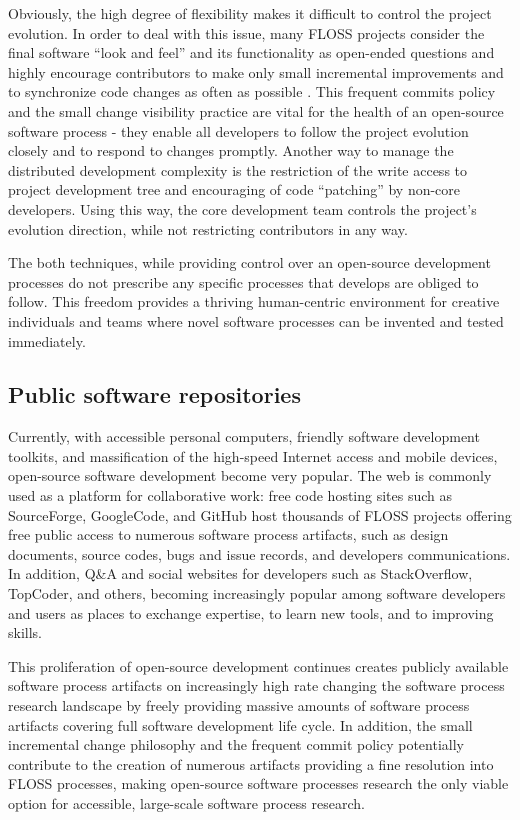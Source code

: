 Obviously, the high degree of flexibility makes it difficult to control the project evolution. 
In order to deal with this issue, many FLOSS projects consider the final software ``look and feel'' and 
its functionality as open-ended questions and highly encourage contributors to make only small incremental 
improvements and to synchronize code changes as often as possible \cite{so-checkin} \cite{git-best-practices1}. 
This frequent commits policy and the small change visibility practice are vital for the health of an open-source 
software process - they enable all developers to follow the project evolution closely and to respond to changes 
promptly.
Another way to manage the distributed development complexity is the restriction of the write access to project 
development tree and encouraging of code ``patching'' by non-core developers. Using this way, the core development
team controls the project's evolution direction, while not restricting contributors in any way.

The both techniques, while providing control over an open-source development processes do not prescribe 
any specific processes that develops are obliged to follow. This freedom provides a thriving human-centric 
environment for creative individuals and teams where novel software processes can be invented and tested 
immediately.

\subsection{Public software repositories}
Currently, with accessible personal computers, friendly software development toolkits, and massification 
of the high-speed Internet access and mobile devices, open-source software development become very popular. 
The web is commonly used as a platform for collaborative work: free code hosting sites such as SourceForge, 
GoogleCode, and GitHub host thousands of FLOSS projects offering free public access to numerous software 
process artifacts, such as design documents, source codes, bugs and issue records, and developers communications.
In addition, Q\&A and social websites for developers such as StackOverflow, TopCoder, and others, becoming 
increasingly popular among software developers and users as places to exchange expertise, to learn new tools, 
and to improving skills.

This proliferation of open-source development continues creates publicly available software process artifacts 
on increasingly high rate changing the software process research landscape by freely providing massive amounts 
of software process artifacts covering full software development life cycle. 
In addition, the small incremental change philosophy and the frequent commit policy potentially contribute 
to the creation of numerous artifacts providing a fine resolution into FLOSS processes, making open-source 
software processes research the only viable option for accessible, large-scale software process research.

